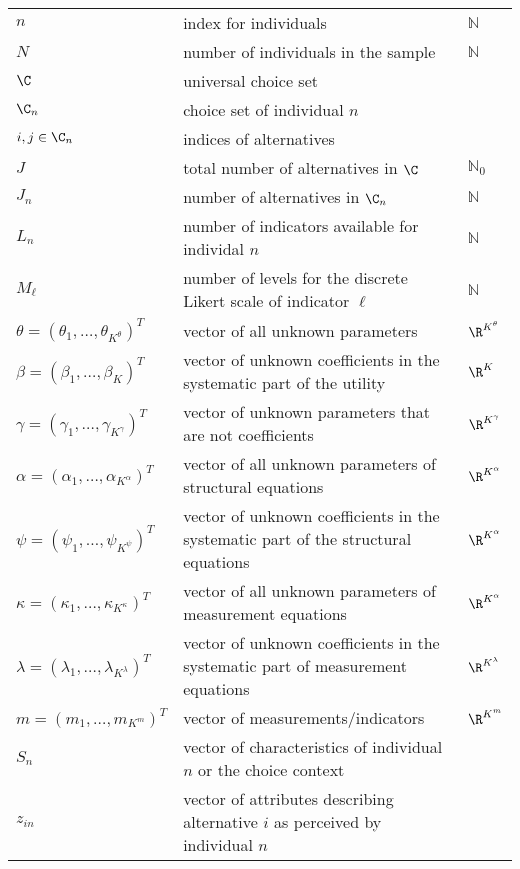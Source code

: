 \documentclass[12pt,a4paper]{article}
\begin{document}
\begin{longtable}{lp{6cm}l}
$n$           & index for individuals         & $\mathbb{N}$ \\
$N$           & number of individuals in the sample & $\mathbb{N}$\\
$\C$          & universal choice set        &    \\
$\C_n$        & choice set of individual $n$ \\
$i,j \in \C_n$  & indices of  alternatives \\
$J$           & total number of alternatives in $\C$ & $\mathbb{N}_0$  \\
  $J_n$         & number of alternatives in $\C_n$ & $\mathbb{N}$ \\
  $L_n$   & number of indicators available for individal $n$ & $\mathbb{N}$ \\
  $M_\ell$ & number of levels for the discrete Likert scale of indicator $\ell$ & $\mathbb{N}$ \\
$\theta=(\theta_1,\ldots,\theta_{K^{\theta}})^T$      & vector of all unknown
parameters  & $\R^{K^{\theta}}$  \\
$\beta=(\beta_1,\ldots,\beta_K)^T$      & vector of  unknown
coefficients in the systematic part
of the utility& $\R^K$  \\
$\gamma=(\gamma_1,\ldots,\gamma_{K^{\gamma}})^T$ & vector of unknown parameters that are not coefficients  & $\R^{K^{\gamma}}$ \\
$\alpha=(\alpha_1,\ldots,\alpha_{K^{\alpha}})^T$ & vector of all unknown parameters of structural equations & $\R^{K^{\alpha}}$ \\
$\psi=(\psi_1,\ldots,\psi_{K^{\psi}})^T$ & vector of  unknown coefficients in the systematic part  of the structural equations & $\R^{K^{\alpha}}$ \\
$\kappa=(\kappa_1,\ldots,\kappa_{K^{\kappa}})^T$ & vector of all unknown parameters of measurement equations & $\R^{K^{\alpha}}$ \\
$\lambda=(\lambda_1,\ldots,\lambda_{K^{\lambda}})^T$ & vector of unknown coefficients in the systematic part of measurement equations & $\R^{K^{\lambda}}$ \\
$m=(m_1,\ldots,m_{K^{m}})^T$ & vector of measurements/indicators & $\R^{K^{m}}$ \\
$S_n$ & vector of characteristics of individual $n$ or the choice context &
\\
$z_{in}$ & vector of attributes describing alternative $i$ as
perceived by individual $n$ \\

\end{longtable}
\end{document}
